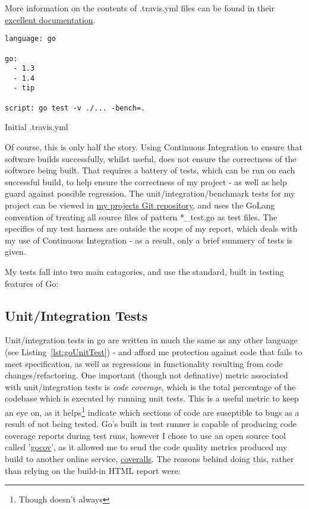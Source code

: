 More information on the contents of .travis.yml files can be found in their
\href{https://docs.travis-ci.com/}{excellent documentation}.

\begin{listing}[ht]
\begin{verbatim}
language: go

go:
  - 1.3
  - 1.4
  - tip

script: go test -v ./... -bench=.
\end{verbatim}
\caption{Initial .travis.yml}
\label{lst:initialTravis}
\end{listing}

Of course, this is only half the story. Using Continuous Integration to ensure
that software builds successfully, whilst useful, does not ensure the correctness
of the software being built. That requires a battery of tests, which can be run
on each successful build, to help ensure the correctness of my project - as well
as help guard against possible regression. The unit/integration/benchmark tests
for my project can be viewed in
\href{https://github.com/FireEater64/gamq}{my projects Git repository}, and uses
the GoLang convention of treating all source files of pattern *_test.go as test
files. The specifics of my test harness are outside the scope of my report, which
deals with my use of Continuous Integration - as a result, only a brief summery of
tests is given.

My tests fall into two main catagories, and use the standard, built in testing
features of Go:

\subsection{Unit/Integration Tests}
\label{sub:Unit/Integration Tests}

Unit/integration tests in go are written in much the same as any other language
(see Listing~\ref{lst:goUnitTest}) - and afford me protection against code that
fails to meet specification, as well as regressions in functionality resulting
from code changes/refactoring. One important (though not definative) metric
associated with unit/integration tests is \emph{code coverage}, which is the
total percentage of the codebase which is executed by running unit tests. This
is a useful metric to keep an eye on, as it helps\footnote{Though doesn't always}
indicate which sections of code are suseptible to bugs as a result of not being
tested. Go's built in test runner is capable of producing code coverage reports
during test runs, however I chose to use an open source tool called '\href{}{gocov}',
as it allowed me to send the code quality metrics produced my build to another
online service, \href{https://coveralls.io/}{coveralls}. The reasons behind doing
this, rather than relying on the build-in HTML report were:

